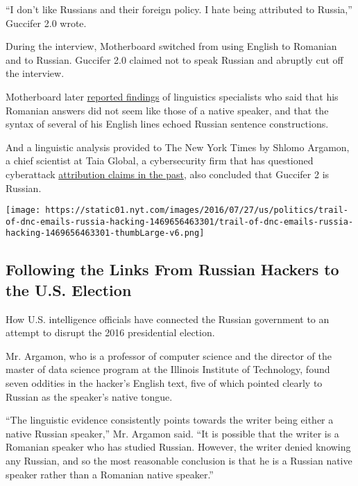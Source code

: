 ``I don't like Russians and their foreign policy. I hate being
attributed to Russia,'' Guccifer 2.0 wrote.

During the interview, Motherboard switched from using English to
Romanian and to Russian. Guccifer 2.0 claimed not to speak Russian and
abruptly cut off the interview.

Motherboard later
\href{http://motherboard.vice.com/read/why-does-dnc-hacker-guccifer-20-talk-like-this}{reported
findings} of linguistics specialists who said that his Romanian answers
did not seem like those of a native speaker, and that the syntax of
several of his English lines echoed Russian sentence constructions.

And a linguistic analysis provided to The New York Times by Shlomo
Argamon, a chief scientist at Taia Global, a cybersecurity firm that has
questioned cyberattack
\href{https://www.wired.com/2015/01/critics-say-new-north-korea-evidence-sony-still-flimsy/}{attribution
claims in the past}, also concluded that Guccifer 2 is Russian.

\href{https://www.nytimes.com/interactive/2016/07/27/us/politics/trail-of-dnc-emails-russia-hacking.html}{}

\texttt{[image: https://static01.nyt.com/images/2016/07/27/us/politics/trail-of-dnc-emails-russia-hacking-1469656463301/trail-of-dnc-emails-russia-hacking-1469656463301-thumbLarge-v6.png]}

\hypertarget{following-the-links-from-russian-hackers-to-the-us-election}{%
\subsection{Following the Links From Russian Hackers to the U.S.
Election}\label{following-the-links-from-russian-hackers-to-the-us-election}}

How U.S. intelligence officials have connected the Russian government to
an attempt to disrupt the 2016 presidential election.

Mr. Argamon, who is a professor of computer science and the director of
the master of data science program at the Illinois Institute of
Technology, found seven oddities in the hacker's English text, five of
which pointed clearly to Russian as the speaker's native tongue.

``The linguistic evidence consistently points towards the writer being
either a native Russian speaker,'' Mr. Argamon said. ``It is possible
that the writer is a Romanian speaker who has studied Russian. However,
the writer denied knowing any Russian, and so the most reasonable
conclusion is that he is a Russian native speaker rather than a Romanian
native speaker.''

